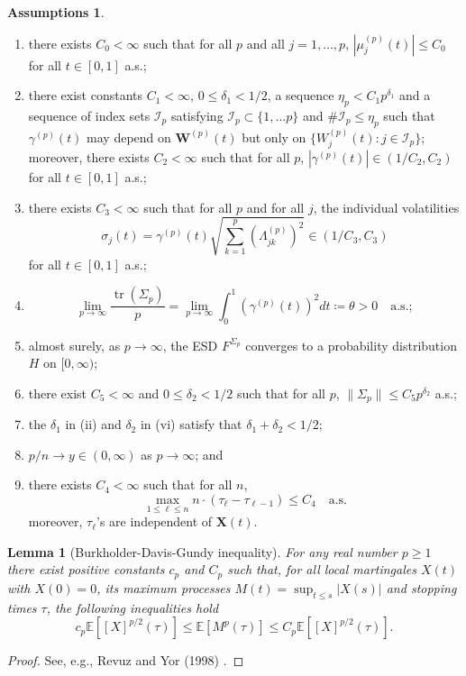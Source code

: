 \documentclass[a4paper,11pt]{book}
\theoremstyle{plain}
\newtheorem{lmm}[thm]{Lemma}
\theoremstyle{definition}
\newtheorem{asmp}[thm]{Assumptions}
\newcommand{\ME}{\mathbb{E}}
\newcommand{\tr}{\operatorname{tr}}
\begin{document}
    \begin{asmp} \label{asmp2} \
    	\begin{enumerate}
    		\item there exists $C_0 < \infty$ such that for all $p$ and all $j = 1, \dots, p$, $|\mu_j^{(p)}(t)| \leq C_0$ for all $t \in [0, 1]$ a.s.;
    		\item there exist constants $C_1 < \infty$, $0 \leq \delta_1 < 1/2$, a sequence $\eta_p < C_1 p^{\delta_1}$ and a sequence of index sets $\mathcal{I}_p$ satisfying $\mathcal{I}_p \subset \{ 1, \dots p \}$ and $\# \mathcal{I}_p \leq \eta_p$ such that $\gamma^{(p)}(t)$ may depend on $\mathbf{W}^{(p)}(t)$ but only on $\{ W_j^{(p)}(t) : j \in \mathcal{I}_p \}$; moreover, there exists $C_2 < \infty$ such that for all $p$, $|\gamma^{(p)}(t)| \in (1/C_2, C_2)$ for all $t \in [0, 1]$ a.s.;
    		\item there exists $C_3 < \infty$ such that for all $p$ and for all $j$, the individual volatilities \[ \sigma_j(t) = \gamma^{(p)}(t)\sqrt{\sum_{k=1}^{p} (\Lambda_{jk}^{(p)})^2} \in (1/C_3, C_3)\] for all $t \in [0, 1]$ a.s.;
    		\item \[ \lim_{p \rightarrow \infty} \frac{\tr(\Sigma_p)}{p} = \lim_{p \rightarrow \infty} \int_{0}^{1} (\gamma^{(p)}(t))^2 dt \coloneqq \theta > 0 \quad \text{a.s.}; \]
    		\item almost surely, as $p \rightarrow \infty$, the ESD $F^{\Sigma_p}$ converges to a probability distribution $H$ on $[0, \infty)$;
    		\item there exist $C_5 < \infty$ and $0 \leq \delta_2 < 1/2$ such that for all $p$, $\| \Sigma_p \| \leq C_5 p^{\delta_2}$ a.s.;
    		\item the $\delta_1$ in (ii) and $\delta_2$ in (vi) satisfy that $\delta_1 + \delta_2 < 1/2$;
    		\item $p/n \rightarrow y \in (0, \infty) $ as $p \rightarrow \infty$; and
    		\item there exists $C_4 < \infty$ such that for all $n$,
    		\[ \max_{1 \leq \ell \leq n} n \cdot (\tau_{\ell} - \tau_{\ell - 1}) \leq C_4 \quad \text{a.s.}  \]
    		moreover, $\tau_{\ell}$'s are independent of $\mathbf{X}(t)$.
    	\end{enumerate}
    \end{asmp}
    
    \begin{lmm}[Burkholder-Davis-Gundy inequality] \label{BDG}
    	For any real number $p \geq 1$ there exist positive constants $c_p$ and $C_p$ such that, for all local martingales $X(t)$ with $X(0) = 0$, its maximum processes $M(t) = \sup_{t \leq s} |X(s)|$ and stopping times $\tau$, the following inequalities hold
    	\[ c_p \ME[[X]^{p/2}(\tau)] \leq \ME[M^p(\tau)] \leq C_p \ME[[X]^{p/2}(\tau)]. \]
    \end{lmm}
    \begin{proof}
    	See, e.g., Revuz and Yor (1998) \cite{RevuzYor}.
    \end{proof}
    
\end{document}
